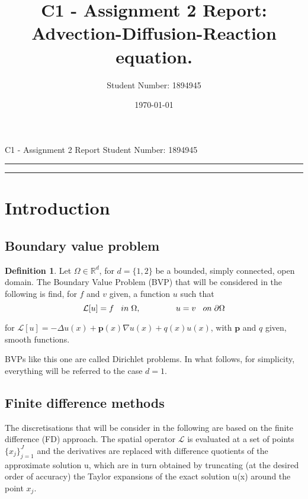 \documentclass[11pt]{article}
\title{C1 - Assignment 2 Report: Advection-Diffusion-Reaction equation.} %
\author{Student Number: 1894945} %
\date{\today} %
\theoremstyle{theorem}
\theoremstyle{definition}
\newtheorem{definition}{Definition}
\begin{document}
\maketitle %

\begin{center}
C1 - Assignment 2 Report \hfill
Student Number: 1894945
\vspace{3pt} \hrule \vspace{3pt} \hrule
\end{center}

\tableofcontents

\clearpage



\section{Introduction}

\subsection{Boundary value problem}

\begin{definition}
	\label{defn:BVP}
	Let $\Omega\in\mathbb{R}^{d}$, for $d=\lbrace 1, 2\rbrace$ be a bounded, simply connected, open domain. The Boundary Value Problem (BVP) that will be considered in the following is find, for $f$ and $v$ given, a function $u$ such that 
	\begin{equation}
		\label{eqn:BVP}
		\mathcal{L}[u]=f\hspace{3mm}in\hspace{1mm}\Omega,\hspace{15mm}u=v\hspace{3mm}on\hspace{1mm}\partial\Omega
	\end{equation}
	
	for $\mathcal{L}[u]=-\Delta u(x) + \mathbf{p}(x)\nabla u(x) + q(x)u(x)$, with $\mathbf{p}$ and $q$ given, smooth functions. 
\end{definition}

BVPs like this one are called Dirichlet problems. In what follows, for simplicity, everything will be referred to the case $d=1$. 

\subsection{Finite difference methods}
The discretisations that will be consider in the following are based on the finite difference (FD) approach. The spatial operator $\mathcal{L}$ is evaluated at a set of points $\lbrace x_j\rbrace_{j=1}^{J}$ and the derivatives are replaced with difference quotients of the approximate solution u, which are in turn obtained by truncating (at the desired order of accuracy) the Taylor expansions of the exact solution u(x) around the point $x_j$.\\
\end{document}
